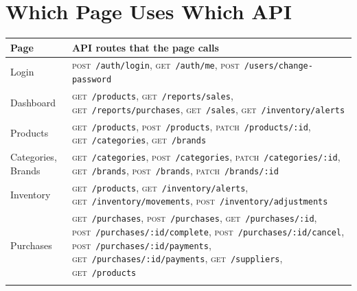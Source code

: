 \documentclass[11pt,a4paper]{article}
\newcommand{\code}[1]{\texttt{#1}}
\begin{document}
\section{Which Page Uses Which API}
\begin{longtable}{@{}P{3.1cm}P{11.9cm}@{}}
\toprule
\textbf{Page} & \textbf{API routes that the page calls} \\
\midrule
\endhead
Login & {\raggedright \textsc{post}~\code{/\allowbreak{}auth/\allowbreak{}login}, \textsc{get}~\code{/\allowbreak{}auth/\allowbreak{}me}, \textsc{post}~\code{/\allowbreak{}users/\allowbreak{}change-password}} \\\addlinespace
Dashboard & {\raggedright \textsc{get}~\code{/\allowbreak{}products}, \textsc{get}~\code{/\allowbreak{}reports/\allowbreak{}sales}, \textsc{get}~\code{/\allowbreak{}reports/\allowbreak{}purchases}, \textsc{get}~\code{/\allowbreak{}sales}, \textsc{get}~\code{/\allowbreak{}inventory/\allowbreak{}alerts}} \\\addlinespace
Products & {\raggedright \textsc{get}~\code{/\allowbreak{}products}, \textsc{post}~\code{/\allowbreak{}products}, \textsc{patch}~\code{/\allowbreak{}products/\allowbreak{}:id}, \textsc{get}~\code{/\allowbreak{}categories}, \textsc{get}~\code{/\allowbreak{}brands}} \\\addlinespace
Categories, Brands & {\raggedright \textsc{get}~\code{/\allowbreak{}categories}, \textsc{post}~\code{/\allowbreak{}categories}, \textsc{patch}~\code{/\allowbreak{}categories/\allowbreak{}:id}, \textsc{get}~\code{/\allowbreak{}brands}, \textsc{post}~\code{/\allowbreak{}brands}, \textsc{patch}~\code{/\allowbreak{}brands/\allowbreak{}:id}} \\\addlinespace
Inventory & {\raggedright \textsc{get}~\code{/\allowbreak{}products}, \textsc{get}~\code{/\allowbreak{}inventory/\allowbreak{}alerts}, \textsc{get}~\code{/\allowbreak{}inventory/\allowbreak{}movements}, \textsc{post}~\code{/\allowbreak{}inventory/\allowbreak{}adjustments}} \\\addlinespace
Purchases & {\raggedright \textsc{get}~\code{/\allowbreak{}purchases}, \textsc{post}~\code{/\allowbreak{}purchases}, \textsc{get}~\code{/\allowbreak{}purchases/\allowbreak{}:id}, \textsc{post}~\code{/\allowbreak{}purchases/\allowbreak{}:id/\allowbreak{}complete}, \textsc{post}~\code{/\allowbreak{}purchases/\allowbreak{}:id/\allowbreak{}cancel}, \textsc{post}~\code{/\allowbreak{}purchases/\allowbreak{}:id/\allowbreak{}payments}, \textsc{get}~\code{/\allowbreak{}purchases/\allowbreak{}:id/\allowbreak{}payments}, \textsc{get}~\code{/\allowbreak{}suppliers}, \textsc{get}~\code{/\allowbreak{}products}} \\\addlinespace

\end{longtable}
\end{document}
